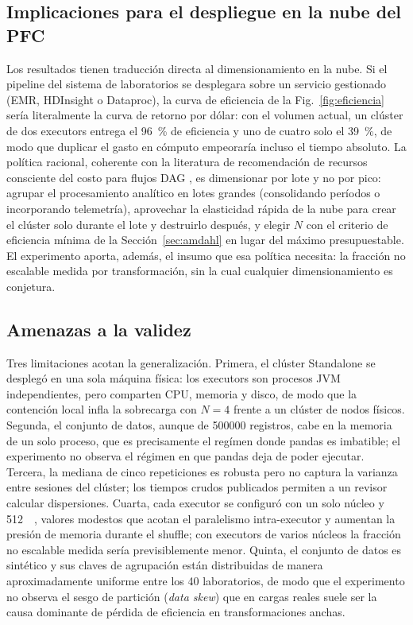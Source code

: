 \documentclass[10pt,journal]{IEEEtran}
\begin{document}
\subsection{Implicaciones para el despliegue en la nube del PFC}
Los resultados tienen traducci\'on directa al dimensionamiento en la nube. Si
el pipeline del sistema de laboratorios se desplegara sobre un servicio
gestionado (EMR, HDInsight o Dataproc), la curva de eficiencia de la
Fig.~\ref{fig:eficiencia} ser\'ia literalmente la curva de retorno por
d\'olar: con el volumen actual, un cl\'uster de dos executors entrega el
\SI{96}{\percent} de eficiencia y uno de cuatro solo el \SI{39}{\percent}, de
modo que duplicar el gasto en c\'omputo empeorar\'ia incluso el tiempo
absoluto. La pol\'itica racional, coherente con la literatura de
recomendaci\'on de recursos consciente del costo para flujos DAG
\cite{asemanmanzar2023}, es dimensionar por lote y no por pico: agrupar el
procesamiento anal\'itico en lotes grandes (consolidando per\'iodos o
incorporando telemetr\'ia), aprovechar la elasticidad r\'apida de la nube
\cite{mell2011} para crear el cl\'uster solo durante el lote y destruirlo
despu\'es, y elegir $N$ con el criterio de eficiencia m\'inima de la
Secci\'on~\ref{sec:amdahl} en lugar del m\'aximo presupuestable. El
experimento aporta, adem\'as, el insumo que esa pol\'itica necesita: la
fracci\'on no escalable medida por transformaci\'on, sin la cual cualquier
dimensionamiento es conjetura.

\subsection{Amenazas a la validez}
Tres limitaciones acotan la generalizaci\'on. Primera, el cl\'uster Standalone
se despleg\'o en una sola m\'aquina f\'isica: los executors son procesos JVM
independientes, pero comparten CPU, memoria y disco, de modo que la contenci\'on
local infla la sobrecarga con $N = 4$ frente a un cl\'uster de nodos f\'isicos.
Segunda, el conjunto de datos, aunque de \num{500000} registros, cabe en la
memoria de un solo proceso, que es precisamente el reg\'imen donde pandas es
imbatible; el experimento no observa el r\'egimen en que pandas deja de poder
ejecutar. Tercera, la mediana de cinco repeticiones es robusta pero no captura
la varianza entre sesiones del cl\'uster; los tiempos crudos publicados
permiten a un revisor calcular dispersiones. Cuarta, cada executor se
configur\'o con un solo n\'ucleo y \SI{512}{\mebi\byte}, valores modestos que
acotan el paralelismo intra-executor y aumentan la presi\'on de memoria durante
el shuffle; con executors de varios n\'ucleos la fracci\'on no escalable medida
ser\'ia previsiblemente menor. Quinta, el conjunto de datos es sint\'etico y
sus claves de agrupaci\'on est\'an distribuidas de manera aproximadamente
uniforme entre los 40 laboratorios, de modo que el experimento no observa el
sesgo de partici\'on (\emph{data skew}) que en cargas reales suele ser la causa
dominante de p\'erdida de eficiencia en transformaciones anchas.
\end{document}
